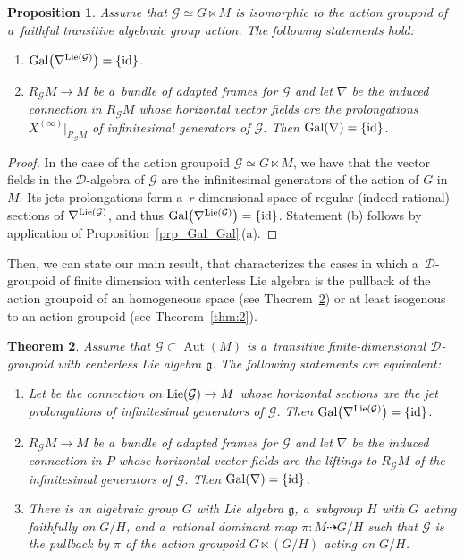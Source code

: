 \documentclass[pdftex]{sigma}
\numberwithin{equation}{section}
\newtheorem{Theorem}{Theorem}[section]
\newtheorem{Proposition}[Theorem]{Proposition}
\theoremstyle{definition}
\begin{document}
\begin{Proposition}
Assume that $\mathcal G \simeq G\ltimes M$ is isomorphic to the action groupoid of a~faithful transitive algebraic group action. The following statements hold:
\begin{enumerate}\itemsep=0pt
\item[$(a)$] $\rm Gal\bigl(\nabla^{{\rm Lie}(\mathcal G)}\bigr) = \{\rm id\}$.
\item[$(b)$] $R_{\mathcal G}M\to M$ be a~bundle of adapted frames for $\mathcal G$ and let $\nabla$ be the induced connection in $R_{\mathcal G}M$ whose horizontal vector fields are the prolongations $X^{(\infty)}|_{R_\mathcal GM}$ of infinitesimal generators of $\mathcal G$. Then ${\rm Gal}(\nabla) = \{\rm id\}$.
\end{enumerate}
\end{Proposition}

\begin{proof}
In the case of the action groupoid $\mathcal G \simeq G\ltimes M$, we have that the vector fields in the $\mathcal D$-algebra of $\mathcal G$ are the infinitesimal generators of the action of $G$ in $M$. Its jets prolongations form a~$r$-dimensional space of regular (indeed rational) sections of $\nabla^{\rm Lie (\mathcal G)}$, and thus ${\rm Gal}\bigl(\nabla^{{\rm Lie}(\mathcal G)}\bigr) = \{{\rm id}\}$. Statement (b) follows by application of Proposition~\ref{prp_Gal_Gal}\,(a).
\end{proof}

Then, we can state our main result, that characterizes the cases in which a~$\mathcal D$-groupoid of finite dimension with centerless Lie algebra is the pullback of the action groupoid of an homogeneous space (see Theorem~\ref{thm:1}) or at least isogenous to an action groupoid (see Theorem~\ref{thm:2}).

\begin{Theorem}\label{thm:1}
Assume that $\mathcal G\subset\operatorname{Aut}(M)$ is a~transitive finite-dimensional $\mathcal D$-groupoid with centerless Lie algebra $\mathfrak g$. The following statements are equivalent:
\begin{enumerate}\itemsep=0pt
\item[$(a)$] Let  be the connection on ${\rm Lie}(\mathcal G)\to M$ whose horizontal sections are the jet prolongations of infinitesimal generators of $\mathcal G$. Then $\rm Gal\bigl(\nabla^{{\rm Lie}(\mathcal G)}\bigr) = \{\rm id\}$.
\item[$(b)$] $R_{\mathcal G}M\to M$ be a~bundle of adapted frames for $\mathcal G$ and let $\nabla$ be the induced connection in $P$ whose horizontal vector fields are the liftings to $R_{\mathcal G}M$ of the infinitesimal generators of $\mathcal G$. Then ${\rm Gal}(\nabla) = \{\rm id\}$.
\item[$(c)$] There is an algebraic group $G$ with Lie algebra $\mathfrak g$, a~subgroup $H$ with $G$ acting faithfully on $G/H$, and a~rational dominant map $\pi\colon M\dasharrow G/H$ such that $\mathcal G$ is the pullback by $\pi$ of the action groupoid $G\ltimes(G/H)$ acting on $G/H$.
\end{enumerate}
\end{Theorem}
\end{document}
